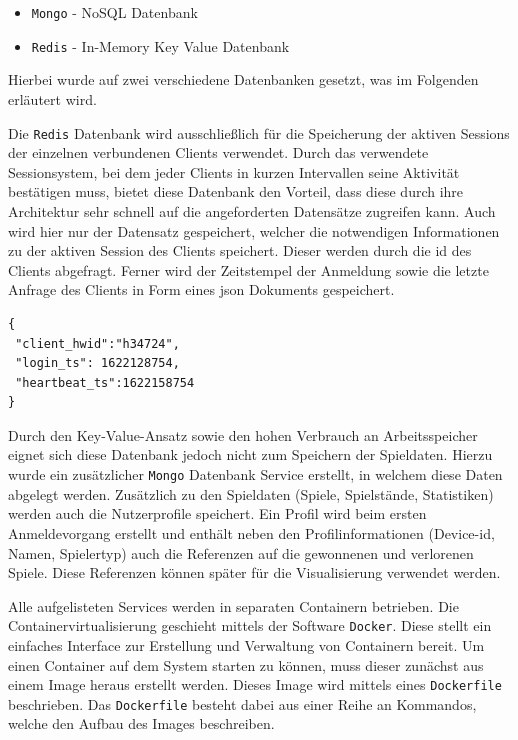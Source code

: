 \begin{itemize}
\tightlist
\item
  \passthrough{\lstinline!Mongo!}\cite{mongodb} - NoSQL Datenbank
\item
  \passthrough{\lstinline!Redis!}\cite{redis} - In-Memory Key Value
  Datenbank
\end{itemize}

Hierbei wurde auf zwei verschiedene Datenbanken gesetzt, was im
Folgenden erläutert wird.

Die \passthrough{\lstinline!Redis!} Datenbank wird ausschließlich für
die Speicherung der aktiven Sessions der einzelnen verbundenen Clients
verwendet. Durch das verwendete Sessionsystem, bei dem jeder Clients in
kurzen Intervallen seine Aktivität bestätigen muss, bietet diese
Datenbank den Vorteil, dass diese durch ihre Architektur sehr schnell
auf die angeforderten Datensätze zugreifen kann. Auch wird hier nur der
Datensatz gespeichert, welcher die notwendigen Informationen zu der
aktiven Session des Clients speichert. Dieser werden durch die \gls{id}
des Clients abgefragt. Ferner wird der Zeitstempel der Anmeldung sowie
die letzte Anfrage des Clients in Form eines \gls{json} Dokuments
gespeichert.

\begin{lstlisting}
{
 "client_hwid":"h34724",
 "login_ts": 1622128754,
 "heartbeat_ts":1622158754
}
\end{lstlisting}

Durch den Key-Value-Ansatz sowie den hohen Verbrauch an Arbeitsspeicher
eignet sich diese Datenbank jedoch nicht zum Speichern der Spieldaten.
Hierzu wurde ein zusätzlicher \passthrough{\lstinline!Mongo!} Datenbank
Service erstellt, in welchem diese Daten abgelegt werden. Zusätzlich zu
den Spieldaten (Spiele, Spielstände, Statistiken) werden auch die
Nutzerprofile speichert. Ein Profil wird beim ersten Anmeldevorgang
erstellt und enthält neben den Profilinformationen (Device-\gls{id},
Namen, Spielertyp) auch die Referenzen auf die gewonnenen und verlorenen
Spiele. Diese Referenzen können später für die Visualisierung verwendet
werden.

Alle aufgelisteten Services werden in separaten Containern betrieben.
Die Containervirtualisierung geschieht mittels der Software
\passthrough{\lstinline!Docker!}\cite{docker}. Diese stellt ein
einfaches Interface zur Erstellung und Verwaltung von Containern bereit.
Um einen Container auf dem System starten zu können, muss dieser
zunächst aus einem Image heraus erstellt werden. Dieses Image wird
mittels eines \passthrough{\lstinline!Dockerfile!} beschrieben. Das
\passthrough{\lstinline!Dockerfile!} besteht dabei aus einer Reihe an
Kommandos, welche den Aufbau des Images beschreiben.

